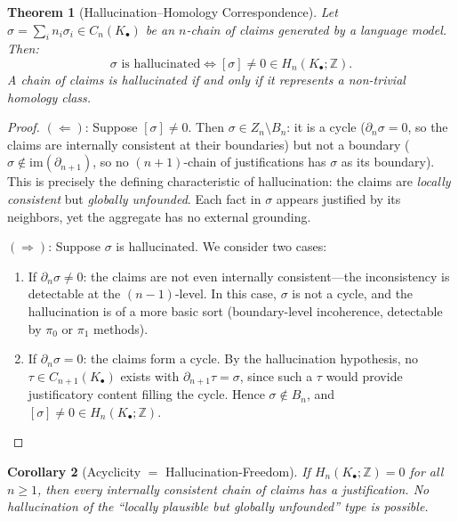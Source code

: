 \documentclass[11pt,a4paper]{article}
\theoremstyle{plain}
\newtheorem{theorem}{Theorem}[section]
\newtheorem{corollary}[theorem]{Corollary}
\theoremstyle{definition}
\theoremstyle{remark}
\newcommand{\im}{\mathrm{im}}
\newcommand{\Z}{\mathbb{Z}}
\begin{document}
\begin{theorem}[Hallucination--Homology Correspondence]
\label{thm:hallucination-homology}
Let $\sigma = \sum_i n_i \sigma_i \in C_n(K_\bullet)$ be an $n$-chain of claims generated by a language model. Then:
\begin{equation}
\label{eq:main-theorem}
\sigma \text{ is hallucinated} \iff [\sigma] \neq 0 \in H_n(K_\bullet; \Z).
\end{equation}
A chain of claims is hallucinated if and only if it represents a non-trivial homology class.
\end{theorem}

\begin{proof}
$(\Longleftarrow)$: Suppose $[\sigma] \neq 0$. Then $\sigma \in Z_n \setminus B_n$: it is a cycle ($\partial_n \sigma = 0$, so the claims are internally consistent at their boundaries) but not a boundary ($\sigma \notin \im(\partial_{n+1})$, so no $(n+1)$-chain of justifications has $\sigma$ as its boundary). This is precisely the defining characteristic of hallucination: the claims are \emph{locally consistent} but \emph{globally unfounded}. Each fact in $\sigma$ appears justified by its neighbors, yet the aggregate has no external grounding.

$(\Longrightarrow)$: Suppose $\sigma$ is hallucinated. We consider two cases:
\begin{enumerate}
  \item If $\partial_n \sigma \neq 0$: the claims are not even internally consistent---the inconsistency is detectable at the $(n-1)$-level. In this case, $\sigma$ is not a cycle, and the hallucination is of a more basic sort (boundary-level incoherence, detectable by $\pi_0$ or $\pi_1$ methods).

  \item If $\partial_n \sigma = 0$: the claims form a cycle. By the hallucination hypothesis, no $\tau \in C_{n+1}(K_\bullet)$ exists with $\partial_{n+1} \tau = \sigma$, since such a $\tau$ would provide justificatory content filling the cycle. Hence $\sigma \notin B_n$, and $[\sigma] \neq 0 \in H_n(K_\bullet; \Z)$.
\end{enumerate}
\end{proof}

\begin{corollary}[Acyclicity $=$ Hallucination-Freedom]
\label{cor:acyclic}
If $H_n(K_\bullet; \Z) = 0$ for all $n \geq 1$, then every internally consistent chain of claims has a justification. No hallucination of the ``locally plausible but globally unfounded'' type is possible.
\end{corollary}
\end{document}
